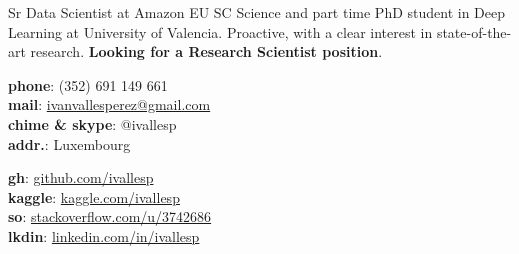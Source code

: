 \documentclass{resume} %
\begin{document}
\noindent

\printname

\begin{minipage}[t]{.46\textwidth}
	\raggedright


Sr Data Scientist at Amazon EU SC Science and part time PhD student in Deep Learning at University of Valencia. Proactive, with a clear interest in state-of-the-art research. \textbf{Looking for a Research Scientist position}.
\end{minipage}\hspace{4pt}
\begin{minipage}[t]{.27\textwidth}
	\raggedright
	{\textbf{phone}: (352) 691 149 661 \\
	\textbf{mail}: \href{mailto:ivanvallesperez@gmail.com}{ivanvallesperez@gmail.com}\\
	\textbf{chime \& skype}: @ivallesp \\
	\textbf{addr.}: Luxembourg
}
\end{minipage}
\begin{minipage}[t]{.27\textwidth}
	\raggedright
	{ \textbf{gh}: \href{https://www.github.com/ivallesp}{github.com/ivallesp}  \\
	  \textbf{kaggle}: \href{https://www.kaggle.com/ivallesp}{kaggle.com/ivallesp}  \\
	  \textbf{so}: \href{https://stackoverflow.com/users/3742686/ivallesp}{stackoverflow.com/u/3742686} \\
	  \textbf{lkdin}: \href{https://www.linkedin.com/in/ivallesp}{linkedin.com/in/ivallesp}
	}
\end{minipage}


\end{document}
